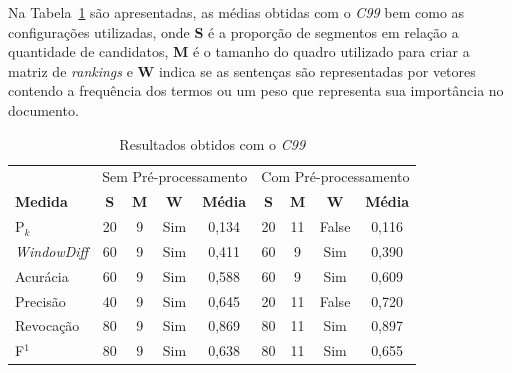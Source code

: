



Na Tabela~\ref{tab:resultadosc99} são apresentadas, as médias obtidas com o \textit{C99} bem como as configurações utilizadas, onde \textbf{S} é a proporção de segmentos em relação a quantidade de candidatos, \textbf{M} é o tamanho do quadro utilizado para criar a matriz de \textit{rankings} e \textbf{W} indica se as sentenças são representadas por vetores contendo a frequência dos termos ou um peso que representa sua importância no documento. %

\begin{table}[!h]
	\centering
	\begin{tabular}{|l||c|c|c|c||c|c|c|c|} \hline

		& \multicolumn{4}{c||}{Sem Pré-processamento} 
		& \multicolumn{4}{c|}{Com Pré-processamento}\\			

		\textbf{Medida} & 
		\textbf{S} & 
		\textbf{M} & 
		\textbf{W} & 
		\textbf{Média} &
		\textbf{S} & 
		\textbf{M} & 
		\textbf{W} & 
		\textbf{Média} \\	\hline

		P$_k$				& 20 & 9 & Sim & 0,134& 20 & 11 & False	& 0,116 \\ \hline  
		\textit{WindowDiff}	& 60 & 9 & Sim & 0,411& 60 &  9 & Sim 	& 0,390 \\ \hline  
		Acurácia			& 60 & 9 & Sim & 0,588& 60 &  9 & Sim 	& 0,609 \\ \hline  
		Precisão			& 40 & 9 & Sim & 0,645& 20 & 11 & False	& 0,720 \\ \hline  
		Revocação			& 80 & 9 & Sim & 0,869& 80 & 11 & Sim 	& 0,897 \\ \hline  
		F$^1$				& 80 & 9 & Sim & 0,638& 80 & 11 & Sim 	& 0,655 \\ \hline  

	\end{tabular}
	\caption{Resultados obtidos com o \textit{C99}}
	\label{tab:resultadosc99}
\end{table}



